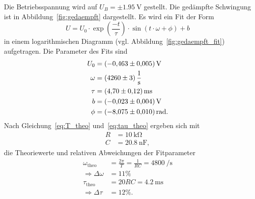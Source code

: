 Die Betriebsspannung wird auf $U_B = \pm \SI{1.95}{\volt}$ gestellt.
Die gedämpfte Schwingung ist in Abbildung~\ref{fig:gedaempft} dargestellt.
Es wird ein Fit der Form
\begin{equation}
U = U_0 \cdot \exp{\left(\frac{-t}{\tau}\right)} \cdot \sin{\left(t \cdot \omega  + \phi\right)} + b
\end{equation}
in einem logarithmischen Diagramm (vgl. Abbildung~\ref{fig:gedaempft_fit}) aufgetragen.
Die Parameter des Fits sind
\begin{align*}
  U_0 &= \SI{-0.463 \pm 0.005}{\volt} \\
  \omega &= \SI{4260 \pm 3}{\per\second} \\
  \tau &= \SI{4.7 \pm 0.12}{\milli\second} \\
  b &= \SI{-0.023 \pm 0.004}{\volt} \\
  \phi &= \SI{-8.075 \pm 0.01}{\radian}.
\end{align*}
 Nach Gleichung~\eqref{eq:T_theo} und~\eqref{eq:tau_theo} ergeben sich mit
\begin{align*}
  R &= \SI{10}{\kilo\ohm} \\
  C &= \SI{20.8}{\nano\farad},
\end{align*}
die Theoriewerte und relativen Abweichungen der Fitparameter
\begin{align*}
  \omega_\text{theo} &= \frac{2\pi}{T} = \frac{1}{R C} = \SI{4800}{\per\second} \\
  \Rightarrow \Delta \omega &= \num{11}\% \\
  \tau_\text{theo} &= 20 RC = \SI{4.2}{\milli\second} \\
  \Rightarrow \Delta \tau &= \num{12}\%.
\end{align*}
